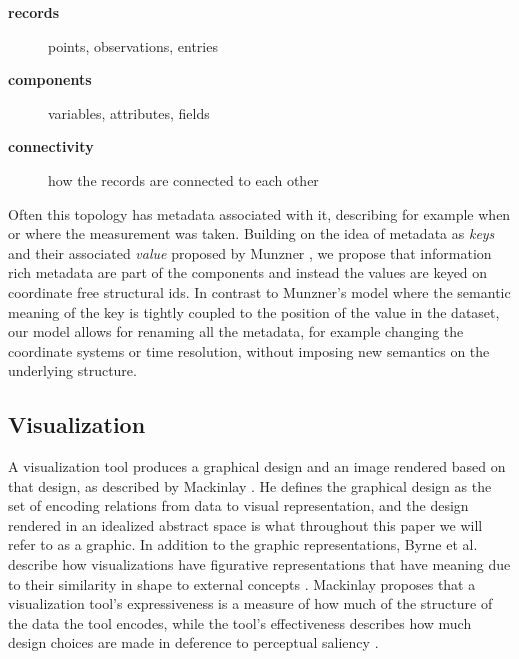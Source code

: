 \documentclass[../main.tex]{subfiles}
\begin{document}
\begin{mdframed}[roundcorner=10pt, frametitle= definitions, frametitlerule=true, frametitlebackgroundcolor=gray!10]
    \begin{description}
        \item[\textbf{records}] points, observations, entries 
        \item[\textbf{components}] variables, attributes, fields 
        \item[\textbf{connectivity}] how the records are connected to each other
    \end{description}
\end{mdframed}

Often this topology has metadata associated with it, describing for example when or where the measurement was taken. Building on the idea of metadata as \textit{keys} and their associated \textit{value} proposed by Munzner \cite{munznerChDataAbstraction}, we propose that information rich metadata are part of the components and instead the values are keyed on coordinate free structural ids. In contrast to Munzner's model where the semantic meaning of the key is tightly coupled to the position of the value in the dataset, our model allows for renaming all the metadata, for example changing the coordinate systems or time resolution, without imposing new semantics on the underlying structure.

\subsection{Visualization}
\label{sec:intro_viz}
A visualization tool produces a graphical design and an image rendered based on that design, as described by Mackinlay \cite{mackinlayAUTOMATICDESIGNGRAPHICAL1987}. He defines the graphical design as the set of encoding relations from data to visual representation\cite{mackinlayAutomatingDesignGraphical1986}, and the design rendered in an idealized abstract space is what throughout this paper we will refer to as a graphic. In addition to the graphic representations, Byrne et al. describe how visualizations have figurative representations that have meaning due to their similarity in shape to external concepts \cite{byrneAcquiredCodesMeaning2016}. Mackinlay  proposes that a visualization tool's expressiveness is a measure of how much of the structure of the data the tool encodes, while the tool's effectiveness describes how much design choices are made in deference to perceptual saliency \cite{clevelandResearchStatisticalGraphics1987,clevelandGraphicalPerceptionTheory1984,chambersGraphicalMethodsData1983a, munznerVisualizationAnalysisDesign2014}.
\end{document}
